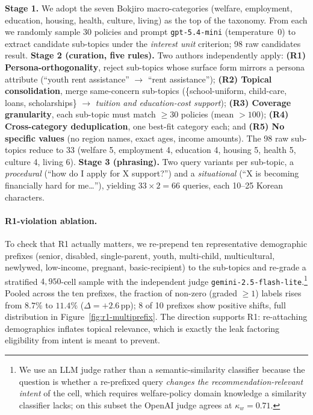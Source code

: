 \documentclass{article}
\newcommand{\nquery}{66}
\begin{document}
\textbf{Stage 1.} We adopt the seven Bokjiro macro-categories
(welfare, employment, education, housing, health, culture, living)
as the top of the taxonomy. From each we randomly sample 30 policies
and prompt \texttt{gpt-5.4-mini} (temperature~0) to extract
candidate sub-topics under the \emph{interest unit} criterion;
98 raw candidates result.
\textbf{Stage 2 (curation, five rules).} Two authors independently
apply: \textbf{(R1) Persona-orthogonality}, reject sub-topics whose
surface form mirrors a persona attribute (``youth rent assistance''
$\to$ ``rent assistance''); \textbf{(R2) Topical consolidation},
merge same-concern sub-topics (\{school-uniform, child-care, loans,
scholarships\} $\to$ \emph{tuition and education-cost support});
\textbf{(R3) Coverage granularity}, each sub-topic must match
$\geq{}30$ policies (mean $>{}100$);
\textbf{(R4) Cross-category deduplication}, one best-fit category
each; and \textbf{(R5) No specific values} (no region names, exact
ages, income amounts). The 98 raw sub-topics reduce to 33 (welfare
5, employment 4, education 4, housing 5, health 5, culture 4, living
6). \textbf{Stage 3 (phrasing).} Two query variants per sub-topic, a
\emph{procedural} (``how do I apply for X support?'') and a
\emph{situational} (``X is becoming financially hard for me\ldots''),
yielding $33{\times}2 = \nquery{}$ queries, each 10--25 Korean
characters.

\paragraph{R1-violation ablation.}
To check that R1 actually matters, we re-prepend ten representative
demographic prefixes (senior, disabled, single-parent, youth,
multi-child, multicultural, newlywed, low-income, pregnant,
basic-recipient) to the sub-topics and re-grade a stratified
$4{,}950$-cell sample with the independent judge
\texttt{gemini-2.5-flash-lite}.\footnote{We use an LLM judge
rather than a semantic-similarity classifier because the question
is whether a re-prefixed query \emph{changes the
recommendation-relevant intent} of the cell, which requires
welfare-policy domain knowledge a similarity classifier lacks; on
this subset the OpenAI judge agrees at $\kappa_w{=}0.71$.}
Pooled across the ten prefixes, the fraction
of non-zero (graded $\geq{}1$) labels rises from $8.7\%$ to
$11.4\%$ ($\Delta{=}{+}2.6$\,pp); 8 of 10 prefixes show positive
shifts, full distribution in Figure~\ref{fig:r1-multiprefix}. The
direction supports R1: re-attaching demographics inflates topical
relevance, which is exactly the leak factoring eligibility from
intent is meant to prevent.
\end{document}
